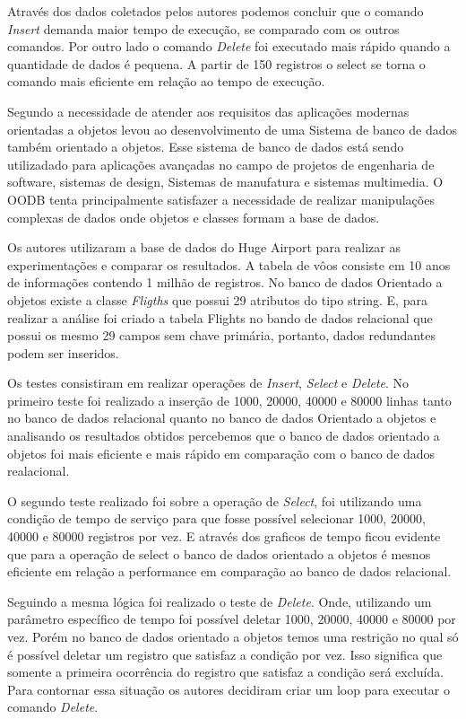 Através dos dados coletados pelos autores podemos concluir que o comando \textit{Insert} demanda maior tempo de execução, se comparado com os outros comandos. Por outro lado o comando \textit{Delete} foi executado mais rápido quando a quantidade de dados é pequena. A partir de 150 registros o select se torna o comando mais eficiente em relação ao tempo de execução. 


Segundo  a necessidade de atender aos requisitos das aplicações modernas orientadas a objetos levou ao desenvolvimento de uma Sistema de banco de dados também orientado a objetos. Esse sistema de banco de dados está sendo utilizadado para aplicações avançadas no campo de projetos de engenharia de software, sistemas de design, Sistemas de manufatura e sistemas multimedia. O OODB tenta principalmente satisfazer a necessidade de realizar manipulações complexas de dados onde objetos e classes formam a base de dados. 

Os autores utilizaram a base de dados do Huge Airport para realizar as experimentações e comparar os resultados. A tabela de vôos consiste em 10 anos de informações contendo 1 milhão de registros. No banco de dados Orientado a objetos existe a classe \textit{Fligths} que possui 29 atributos do tipo string. E, para realizar a análise foi criado a tabela Flights no bando de dados relacional que possui os mesmo 29 campos sem chave primária, portanto, dados redundantes podem ser inseridos. 

Os testes consistiram em realizar operações de \textit{Insert}, \textit{Select} e \textit{Delete}. No primeiro teste foi realizado a inserção de 1000, 20000, 40000 e 80000 linhas tanto no banco de dados relacional quanto no banco de dados Orientado a objetos e analisando os resultados obtidos percebemos que o banco de dados orientado a objetos foi mais eficiente e mais rápido em comparação com o banco de dados realacional. 

O segundo teste realizado foi sobre a operação de \textit{Select}, foi utilizando uma condição de tempo de serviço para que fosse possível selecionar 1000, 20000, 40000 e 80000 registros por vez. E através dos graficos de tempo ficou evidente que para a operação de select o banco de dados orientado a objetos é mesnos eficiente em relação a performance em comparação ao banco de dados relacional. 

Seguindo a mesma lógica foi realizado o teste de \textit{Delete}. Onde, utilizando um parâmetro específico de tempo foi possível deletar 1000, 20000, 40000 e 80000 por vez. Porém no banco de dados orientado a objetos temos uma restrição no qual só é possível deletar um registro que satisfaz a condição por vez. Isso significa que somente a primeira ocorrência do registro que satisfaz a condição será excluída. Para contornar essa situação os autores decidiram criar um loop para executar o comando \textit{Delete}. 

